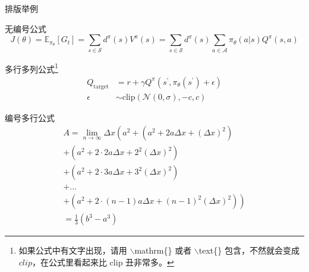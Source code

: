 \documentclass[aspectratio=169]{beamer}
\begin{document}
\begin{frame}{排版举例}
    \begin{exampleblock}{无编号公式} %
        \begin{equation*}
            J(\theta) = \mathbb{E}_{\pi_\theta}[G_t] = \sum_{s\in\mathcal{S}} d^\pi (s)V^\pi(s)=\sum_{s\in\mathcal{S}} d^\pi(s)\sum_{a\in\mathcal{A}}\pi_\theta(a|s)Q^\pi(s,a)
        \end{equation*}
    \end{exampleblock}
    \begin{exampleblock}{多行多列公式\footnote{如果公式中有文字出现，请用 $\backslash$mathrm\{\} 或者 $\backslash$text\{\} 包含，不然就会变成 $clip$，在公式里看起来比 $\mathrm{clip}$ 丑非常多。}}
        \begin{align}
            Q_\mathrm{target}&=r+\gamma Q^\pi(s^\prime, \pi_\theta(s^\prime)+\epsilon)\\
            \epsilon&\sim\mathrm{clip}(\mathcal{N}(0, \sigma), -c, c)\nonumber
        \end{align}
    \end{exampleblock}
\end{frame}

\begin{frame}
    \begin{exampleblock}{编号多行公式}
        \begin{multline}
            A=\lim_{n\rightarrow\infty}\Delta x\left(a^{2}+\left(a^{2}+2a\Delta x+\left(\Delta x\right)^{2}\right)\right.\label{eq:reset}\\
            +\left(a^{2}+2\cdot2a\Delta x+2^{2}\left(\Delta x\right)^{2}\right)\\
            +\left(a^{2}+2\cdot3a\Delta x+3^{2}\left(\Delta x\right)^{2}\right)\\
            +\ldots\\
            \left.+\left(a^{2}+2\cdot(n-1)a\Delta x+(n-1)^{2}\left(\Delta x\right)^{2}\right)\right)\\
            =\frac{1}{3}\left(b^{3}-a^{3}\right)
        \end{multline}
    \end{exampleblock}
\end{frame}
\end{document}
